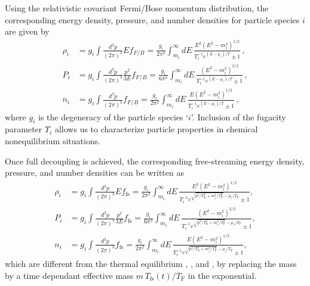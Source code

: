 Using the relativistic covariant Fermi/Bose momentum distribution, the corresponding energy density, pressure, and number densities for particle species $i$ are given by
\begin{align}
\rho_i&=g_i\int\!\!\frac{d^3p}{(2\pi)^3}Ef_{F/B}=\frac{g_i}{2\pi^2}\!\int_{m_i}^\infty\!\!\!dE\,\frac{E^2\left(E^2-m_i^2\right)^{1/2}}{\Upsilon_i^{-1}e^{(E-\mu_i)/T}\pm 1}\,,\label{energy_density}\\[0.2cm]
P_i&=g_i\int\!\!\frac{d^3p}{(2\pi)^3}\frac{p^2}{3E}f_{F/B}=\frac{g_i}{6\pi^2}\!\int_{m_i}^\infty\!\!\!dE\,\frac{\left(E^2-m_i^2\right)^{3/2}}{\Upsilon_i^{-1} e^{(E-\mu_i)/T}\pm 1}\,,\label{Pressure_density}\\[0.2cm]
n_i&=g_i\int\!\!\frac{d^3p}{(2\pi)^3}f_{F/B}=\frac{g_i}{2\pi^2}\!\int_{m_i}^\infty\!\!\!dE\,\frac{E(E^2-m_i^2)^{1/2} }{\Upsilon_i^{-1}e^{(E-\mu_i)/T}\pm 1}\,,
\label{number_density}
\end{align}
where $g_i$ is the degeneracy of the particle species `$i$'. Inclusion of the fugacity parameter $\Upsilon_i$ allows us to characterize particle properties in chemical  nonequilibrium situations.

Once full decoupling is achieved, the corresponding free-streaming energy density, pressure, and number densities can be written as
\begin{align}
\rho_i&=g_i\int\!\!\frac{d^3p}{(2\pi)^3}Ef_\mathrm{fs}=\frac{g_i}{2\pi^2}\!\int_{m_i}^\infty\!\!\!dE\,\frac{E^2\left(E^2-m_i^2\right)^{1/2}}{\Upsilon_i^{-1}e^{\sqrt{p^2/T_\mathrm{fs}^2+m_i^2 /T_\mathrm{F}^2}-\mu_i/T_\mathrm{F}}\pm 1},\label{free_energy_density}\\[0.2cm]
P_i&=g_i\int\!\!\frac{d^3p}{(2\pi)^3}\frac{p^2}{3E}f_\mathrm{fs}=\frac{g_i}{6\pi^2}\!\int_{m_i}^\infty\!\!\!dE\,\frac{\left(E^2-m_i^2\right)^{3/2}}{\Upsilon_i^{-1}e^{\sqrt{p^2/T_\mathrm{fs}^2+m_i^2 /T_\mathrm{F}^2}-\mu_i/T_\mathrm{F}}\pm1},\label{free_Pressure_density}\\[0.2cm]
n_i&=g_i\int\!\!\frac{d^3p}{(2\pi)^3}f_\mathrm{fs}=\frac{g_i}{2\pi^2}\!\int_{m_i}^\infty\!\!\!dE\,\frac{E(E^2-m_i^2)^{1/2} }{\Upsilon_i^{-1}e^{\sqrt{p^2/T_\mathrm{fs}^2+m_i^2 /T_\mathrm{F}^2}-\mu_i/T_\mathrm{F}}\pm1},
\label{free_number_density}
\end{align} 
which are different from the thermal equilibrium , , and , by replacing the mass by a time dependant effective mass $m\,T_\mathrm{fs}(t)/T_\mathrm{F}$ in the exponential.

